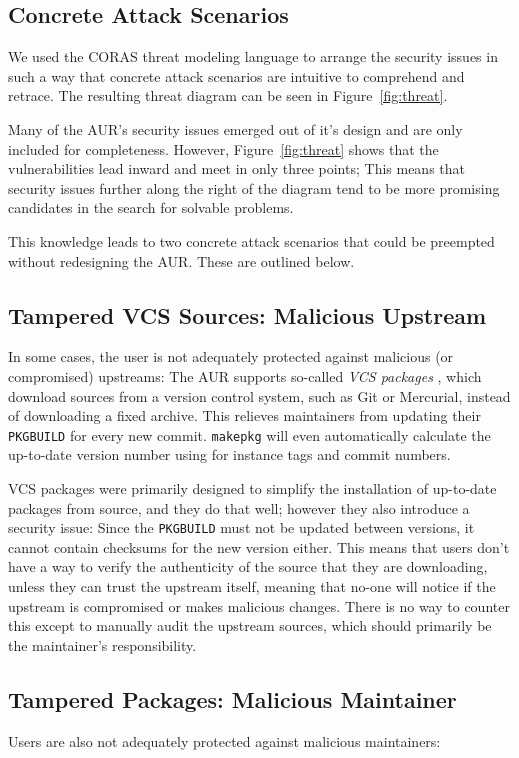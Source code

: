 \subsection{Concrete Attack Scenarios}
We used the CORAS \cite{Dahl:2007} threat modeling language to arrange the security issues in such a way that concrete attack scenarios are intuitive to comprehend and retrace. The resulting threat diagram can be seen in Figure~\ref{fig:threat}.

Many of the AUR's security issues emerged out of it's design and are only included for completeness. However, Figure~\ref{fig:threat} shows that the vulnerabilities lead inward and meet in only three points; This means that security issues further along the right of the diagram tend to be more promising candidates in the search for solvable problems.

This knowledge leads to two concrete attack scenarios that could be preempted without redesigning the AUR. These are outlined below.

\subsection{Tampered VCS Sources: Malicious Upstream}
In some cases, the user is not adequately protected against malicious (or compromised) upstreams:
The AUR supports so-called \emph{VCS packages} \cite{wiki:VCSPackages}, which download sources from a version control system, such as Git or Mercurial, instead of downloading a fixed archive. This relieves maintainers from updating their \texttt{PKGBUILD} for every new commit.
\texttt{makepkg} will even automatically calculate the up-to-date version number using for instance tags and commit numbers.

VCS packages were primarily designed to simplify the installation of up-to-date packages from source, and they do that well; however they also introduce a security issue:
Since the \texttt{PKGBUILD} must not be updated between versions, it cannot contain checksums for the new version either.
This means that users don't have a way to verify the authenticity of the source that they are downloading, unless they can trust the upstream itself, meaning that no-one will notice if the upstream is compromised or makes malicious changes. There is no way to counter this except to manually audit the upstream sources, which should primarily be the maintainer's responsibility.

\subsection{Tampered Packages: Malicious Maintainer}
Users are also not adequately protected against malicious maintainers:

